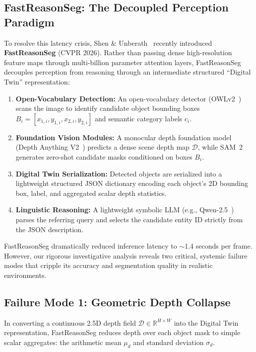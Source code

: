 \documentclass[10pt,twocolumn,letterpaper]{article}
\begin{document}
\subsection{FastReasonSeg: The Decoupled Perception Paradigm}
To resolve this latency crisis, Shen \& Unberath~\cite{shen2026fast} recently introduced \textbf{FastReasonSeg} (CVPR 2026). Rather than passing dense high-resolution feature maps through multi-billion parameter attention layers, FastReasonSeg decouples perception from reasoning through an intermediate structured ``Digital Twin'' representation:
\begin{enumerate}[leftmargin=*,itemsep=1pt,topsep=1pt]
    \item \textbf{Open-Vocabulary Detection:} An open-vocabulary detector (OWLv2~\cite{minderer2024scaling}) scans the image to identify candidate object bounding boxes $B_i = [x_{1,i}, y_{1,i}, x_{2,i}, y_{2,i}]$ and semantic category labels $c_i$.
    \item \textbf{Foundation Vision Modules:} A monocular depth foundation model (Depth Anything V2~\cite{yang2024depthanything}) predicts a dense scene depth map $\mathcal{D}$, while SAM~2~\cite{ravi2024sam2} generates zero-shot candidate masks conditioned on boxes $B_i$.
    \item \textbf{Digital Twin Serialization:} Detected objects are serialized into a lightweight structured JSON dictionary encoding each object's 2D bounding box, label, and aggregated scalar depth statistics.
    \item \textbf{Linguistic Reasoning:} A lightweight symbolic LLM (e.g., Qwen-2.5~\cite{yang2024qwen2}) parses the referring query and selects the candidate entity ID strictly from the JSON description.
\end{enumerate}
FastReasonSeg dramatically reduced inference latency to $\sim$1.4 seconds per frame. However, our rigorous investigative analysis reveals two critical, systemic failure modes that cripple its accuracy and segmentation quality in realistic environments.

\subsection{Failure Mode 1: Geometric Depth Collapse}
In converting a continuous 2.5D depth field $\mathcal{D} \in \mathbb{R}^{H \times W}$ into the Digital Twin representation, FastReasonSeg reduces depth over each object mask to simple scalar aggregates: the arithmetic mean $\mu_d$ and standard deviation $\sigma_d$. 
\end{document}
